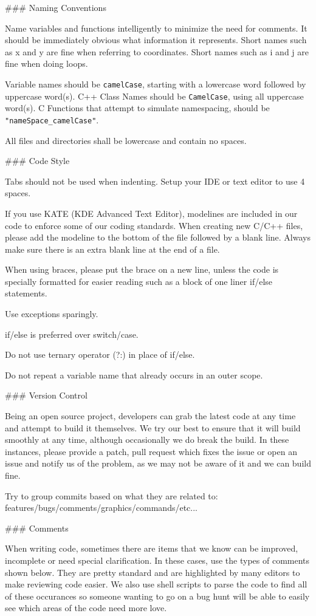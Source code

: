 ### Naming Conventions

Name variables and functions intelligently to minimize the need for comments.
It should be immediately obvious what information it represents.
Short names such as x and y are fine when referring to coordinates.
Short names such as i and j are fine when doing loops.

Variable names should be \texttt{camelCase}, starting with a lowercase word followed by uppercase word(s).
C++ Class Names should be \texttt{CamelCase}, using all uppercase word(s).
C Functions that attempt to simulate namespacing, should be \texttt{"nameSpace\_camelCase"}.

All files and directories shall be lowercase and contain no spaces.

### Code Style

Tabs should not be used when indenting. Setup your IDE or text editor to use 4 spaces.

If you use KATE (KDE Advanced Text Editor), modelines are included in our code to enforce 
some of our coding standards. When creating new C/C++ files, please add
the modeline to the bottom of the file followed by a blank line. Always make sure there
is an extra blank line at the end of a file.

When using braces, please put the brace on a new line, unless the code is specially formatted
for easier reading such as a block of one liner if/else statements.

Use exceptions sparingly.

if/else is preferred over switch/case.

Do not use ternary operator (?:) in place of if/else.

Do not repeat a variable name that already occurs in an outer scope.

### Version Control

Being an open source project, developers can grab the latest code at any time
and attempt to build it themselves. We try our best to ensure that it will build smoothly
at any time, although occasionally we do break the build. In these instances,
please provide a patch, pull request which fixes the issue or open an issue and
notify us of the problem, as we may not be aware of it and we can build fine.

Try to group commits based on what they are related to: features/bugs/comments/graphics/commands/etc...

### Comments

When writing code, sometimes there are items that we know can be improved,
incomplete or need special clarification. In these cases, use the types of
comments shown below. They are pretty standard and are highlighted by many editors to
make reviewing code easier. We also use shell scripts to parse the code to find
all of these occurances so someone wanting to go on a bug hunt will be able to
easily see which areas of the code need more love.

